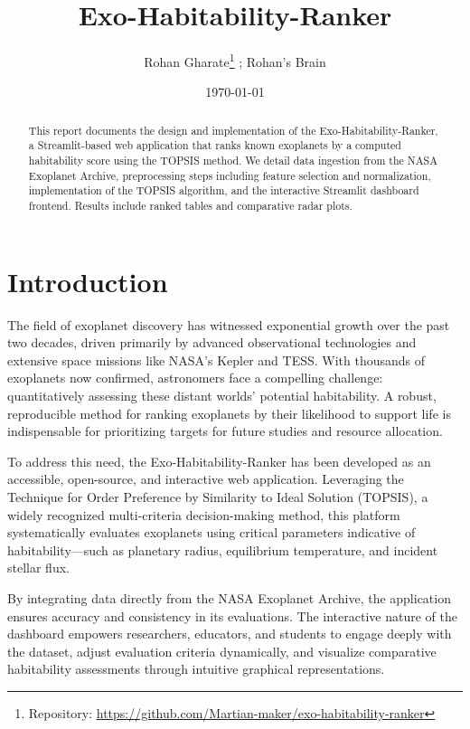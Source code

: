 \documentclass[12pt]{article}
\title{Exo-Habitability-Ranker}
\author{Rohan Gharate\thanks{Repository: \url{https://github.com/Martian-maker/exo-habitability-ranker}} ; Rohan's Brain}
\date{\today}
\begin{document}
\maketitle
\thispagestyle{empty}

\newpage

\begin{abstract}
This report documents the design and implementation of the Exo-Habitability-Ranker, a Streamlit-based web application that ranks known exoplanets by a computed habitability score using the TOPSIS method. We detail data ingestion from the NASA Exoplanet Archive, preprocessing steps including feature selection and normalization, implementation of the TOPSIS algorithm, and the interactive Streamlit dashboard frontend. Results include ranked tables and comparative radar plots. \end{abstract}

\newpage
\tableofcontents
\newpage

\section{Introduction}\label{sec:intro}

The field of exoplanet discovery has witnessed exponential growth over the past two decades, driven primarily by advanced observational technologies and extensive space missions like NASA's Kepler and TESS. With thousands of exoplanets now confirmed, astronomers face a compelling challenge: quantitatively assessing these distant worlds' potential habitability. A robust, reproducible method for ranking exoplanets by their likelihood to support life is indispensable for prioritizing targets for future studies and resource allocation.

To address this need, the Exo-Habitability-Ranker has been developed as an accessible, open-source, and interactive web application. Leveraging the Technique for Order Preference by Similarity to Ideal Solution (TOPSIS), a widely recognized multi-criteria decision-making method, this platform systematically evaluates exoplanets using critical parameters indicative of habitability—such as planetary radius, equilibrium temperature, and incident stellar flux.

By integrating data directly from the NASA Exoplanet Archive, the application ensures accuracy and consistency in its evaluations. The interactive nature of the dashboard empowers researchers, educators, and students to engage deeply with the dataset, adjust evaluation criteria dynamically, and visualize comparative habitability assessments through intuitive graphical representations.
\end{document}
